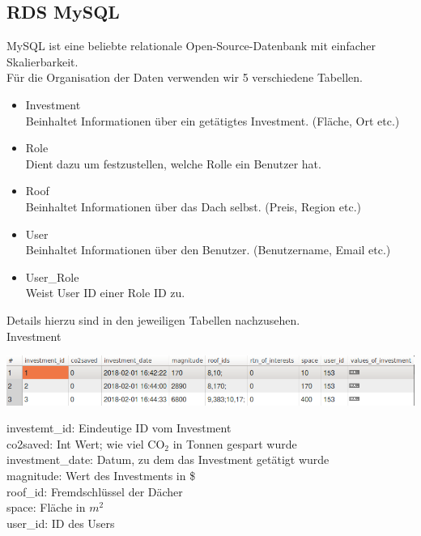 \documentclass[12pt,a4paper]{article}
\begin{document}
\subsection{RDS MySQL}
MySQL ist eine beliebte relationale Open-Source-Datenbank mit einfacher Skalierbarkeit.\\
Für die Organisation der Daten verwenden wir 5 verschiedene Tabellen. 
\begin{itemize}
	\item[\textbullet] Investment\\
	Beinhaltet Informationen über ein getätigtes Investment. (Fläche, Ort etc.)
	\item[\textbullet] Role\\
	Dient dazu um festzustellen, welche Rolle ein Benutzer hat.
	\item[\textbullet] Roof\\
	Beinhaltet Informationen über das Dach selbst. (Preis, Region etc.)
	\item[\textbullet] User\\
	Beinhaltet Informationen über den Benutzer. (Benutzername, Email etc.)
	\item[\textbullet] User\_Role\\
	Weist User ID einer Role ID zu.
\end{itemize}
Details hierzu sind in den jeweiligen Tabellen nachzusehen.\\

\textbullet Investment

\includegraphics[scale=0.5]{./Graphics/investment}
\bigskip

\noindent \textbullet investemt\_id: Eindeutige ID vom Investment\\
\textbullet co2saved: Int Wert; wie viel CO$_2$ in Tonnen gespart wurde\\
\textbullet investment\_date: Datum, zu dem das Investment getätigt wurde\\
\textbullet magnitude: Wert des Investments in \$ \\
\textbullet roof\_id: Fremdschlüssel der Dächer \\
\textbullet space: Fläche in $m^2$\\
\textbullet user\_id: ID des Users\\
\bigskip
\end{document}
